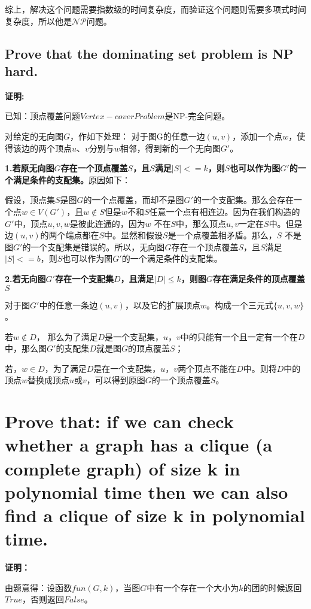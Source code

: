 \documentclass[]{article}
\begin{document}
\begin{multicols}{2}
{	综上，解决这个问题需要指数级的时间复杂度，而验证这个问题则需要多项式时间复杂度，所以他是$\mathcal{NP}$问题。}
\subsection*{ Prove that the dominating set problem is NP hard.}
{\large \textbf{证明:}
	
	已知：顶点覆盖问题$Vertex-cover Problem$是NP-完全问题。
	
	对给定的无向图$ G $，作如下处理：
	对于图G的任意一边$(u, v)$，添加一个点$ w $，使得该边的两个顶点$ u、v $分别与$ w $相邻，得到新的一个无向图$ G' $。
	
	\textbf{1.若原无向图$ G $存在一个顶点覆盖$ S $，且$ S $满足$ |S|<= k $，则$ S $也可以作为图$ G' $的一个满足条件的支配集。}原因如下：
	
	假设，顶点集$ S $是图$ G $的一个点覆盖，而却不是图$ G' $的一个支配集。那么会存在一个点$ w \in V(G') $，且$ w \notin S$但是$ w $不和$ S $任意一个点有相连边。因为在我们构造的$ G' $中，顶点$ u, v, w $是彼此连通的，因为$ w $ 不在$ S $中，那么顶点$ u, v $一定在$ S $中。但是边$ (u, v) $的两个端点都在$ S $中。显然和假设$ S $是一个点覆盖相矛盾。那么，$ S $ 不是图$ G' $的一个支配集是错误的。所以，无向图$ G $存在一个顶点覆盖$ S $，且$ S $满足$ |S|<= b $，则$ S $也可以作为图$ G' $的一个满足条件的支配集。
	
	\textbf{2.若无向图$ G' $存在一个支配集$ D $，且满足$ \left| D \right| \leq k$，则图$ G $存在满足条件的顶点覆盖$ S $}
	
	对于图$ G' $中的任意一条边$ (u, v) $，以及它的扩展顶点$ w $。构成一个三元式$ \{u, v, w\} $。
	
	若$ w \notin D $， 那么为了满足$ D $是一个支配集，$ u，v $中的只能有一个且一定有一个在$ D $中，那么图$ G' $的支配集$ D $就是图$ G $的顶点覆盖$ S $；
	
	若，$ w \in D $，为了满足$ D $是在一个支配集，$ u，v $两个顶点不能在$ D $中。则将$ D $中的顶点$ w $替换成顶点$ u $或$ v $，可以得到原图$ G $的一个顶点覆盖$ S $。}

\section{Prove that: if we can check whether a graph has a clique (a complete graph) of size k in polynomial time then we can also find a clique of size k in polynomial time.}

{\large \textbf{证明：}
	
	由题意得：设函数$ fun(G, k) $，当图$ G $中有一个存在一个大小为$ k $的团的时候返回$ True $，否则返回$ False $。}


\end{multicols}
\end{document}
